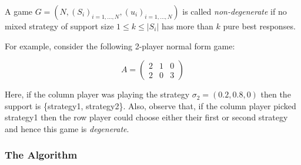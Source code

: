 \begin{definition}
    A game \(G = (N, {(S_{i})}_{i = 1, \ldots, N}, {(u_{i})}_{i = 1, \ldots, N})\)
    is called \emph{non-degenerate} if no mixed strategy of support size \(1 \le
    k \le |S_{i}|\) has more than \(k\) pure best responses.
\end{definition}\label{def:non_degen}

For example, consider the following 2-player normal form game:
\begin{center}
    \begin{equation}
            A = \begin{pmatrix}
                    2 & 1 & 0\\
                    2 & 0 & 3
            \end{pmatrix}
    \end{equation}
\end{center}

Here, if the column player was playing the strategy \(\sigma_{2} = (0.2, 0.8,
0)\) then the support is \{strategy1, strategy2\}. Also, observe that, if the
column player picked strategy1 then the row player could choose either their
first or second strategy and hence this game is \textit{degenerate}. 

\subsubsection{The Algorithm}\label{subsubsec:The_Algorithm}

